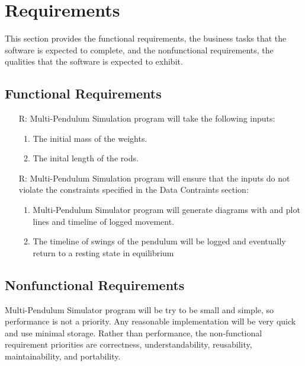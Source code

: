 \documentclass[12pt]{article}
\newcounter{reqnum} %
\begin{document}
\newpage
\section{Requirements}

This section provides the functional requirements, the business tasks that the
software is expected to complete, and the nonfunctional requirements, the
qualities that the software is expected to exhibit.


\subsection{Functional Requirements}

\noindent \begin{itemize}

\item[R\refstepcounter{reqnum}\thereqnum:] Multi-Pendulum Simulation program will 
  take the following inputs:
  \begin{enumerate} \item The initial mass of the weights. 
                    \item The inital length of the rods.
  \end{enumerate}

\item[R\refstepcounter{reqnum}\thereqnum:] Multi-Pendulum Simulation program
  will ensure that the inputs do not violate the constraints specified in the Data Contraints section:
    \begin{enumerate} \item Multi-Pendulum Simulator program will 
generate diagrams with and plot lines and timeline of logged movement. 
                    \item The timeline of swings of the pendulum will be logged and eventually return
                    to a resting state in equilibrium
  \end{enumerate}


\end{itemize}
\newpage
\subsection{Nonfunctional Requirements}

Multi-Pendulum Simulator program will be try to be small and simple, so performance is not a 
priority. Any reasonable implementation will be very quick and use minimal 
storage. Rather than performance, the non-functional requirement priorities 
are correctness, understandability, reusability, maintainability, and 
portability. 
\end{document}
